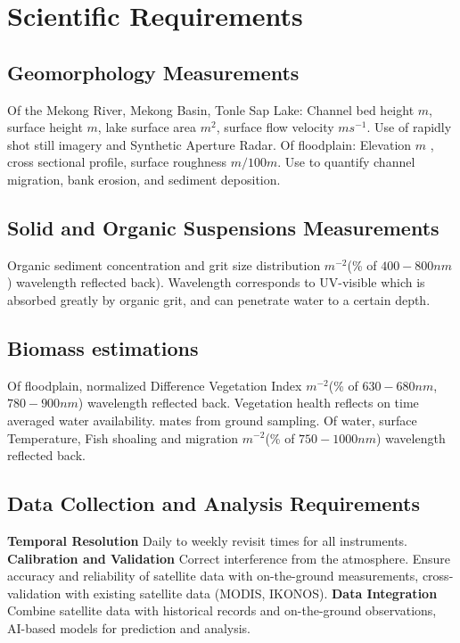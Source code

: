 \section{Scientific Requirements}
\subsection{Geomorphology Measurements}
Of the Mekong River, Mekong Basin, Tonle Sap Lake: Channel bed height \(m\), surface height \(m\), lake surface area \(m^2\), surface flow velocity \(ms^{-1}\). Use of rapidly shot still imagery and Synthetic Aperture Radar.
Of floodplain: Elevation \(m\) , cross sectional profile, surface roughness \(m/100m\). Use to quantify channel migration, bank erosion, and sediment deposition.

\subsection{Solid and Organic Suspensions Measurements}
Organic sediment concentration and grit size distribution \(m^{-2}\)(\% of \(400-800nm\)) wavelength reflected back). Wavelength corresponds to UV-visible which is absorbed greatly by organic grit, and can penetrate water to a certain depth.

\subsection{Biomass estimations}
Of floodplain, normalized Difference Vegetation Index \(m^{-2}\)(\% of \(630-680 nm\), \(780-900nm\)) wavelength reflected back. Vegetation health reflects on time averaged water availability.
mates from ground sampling.
Of water, surface Temperature, Fish shoaling and migration \(m^{-2}\)(\% of \(750-1000nm\)) wavelength reflected back.

\subsection{Data Collection and Analysis Requirements}

    \textbf{Temporal Resolution} Daily to weekly revisit times for all instruments.
    \textbf{Calibration and Validation} Correct interference from the atmosphere. Ensure accuracy and reliability of satellite data with on-the-ground measurements, cross-validation with existing satellite data (MODIS, IKONOS). 
    \textbf{Data Integration} Combine satellite data with historical records and on-the-ground observations, AI-based models for prediction and analysis.